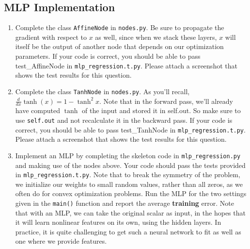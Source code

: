 \documentclass{article}
\theoremstyle{plain}
\theoremstyle{definition}
\begin{document}
\subsection{MLP Implementation}
\begin{enumerate}
\setcounter{enumi}{\value{saveenum}}
\item Complete the class \texttt{AffineNode} in \texttt{nodes.py}. Be sure
to propagate the gradient with respect to $x$ as well, since when
we stack these layers, $x$ will itself be the output of another node
that depends on our optimization parameters. If your code is correct, you should be able to pass test\_AffineNode in \texttt{mlp\_regression.t.py}. Please attach a screenshot that shows the test results for this question.
\item Complete the class \texttt{TanhNode} in \texttt{nodes.py}. As you'll
recall, $\frac{d}{dx}\tanh(x)=1-\tanh^{2}x$. Note that in the forward
pass, we'll already have computed $\tanh$ of the input and stored
it in self.out. So make sure to use \texttt{self.out} and not recalculate
it in the backward pass. If your code is correct, you should be able to pass test\_TanhNode in \texttt{mlp\_regression.t.py}. Please attach a screenshot that shows the test results for this question.
\item Implement an MLP by completing the skeleton code in \texttt{mlp\_regression.py}
and making use of the nodes above. Your code should pass the tests
provided in \texttt{mlp\_regression.t.py}. Note that to break the symmetry
of the problem, we initialize our weights to small random values,
rather than all zeros, as we often do for convex optimization problems.
Run the MLP for the two settings given in the \texttt{main()} function
and report the average \textbf{training} error. Note that with an
MLP, we can take the original scalar as input, in the hopes that it
will learn nonlinear features on its own, using the hidden layers.
In practice, it is quite challenging to get such a neural network
to fit as well as one where we provide features.
\setcounter{saveenum}{\value{enumi}}
\end{enumerate}
\end{document}
